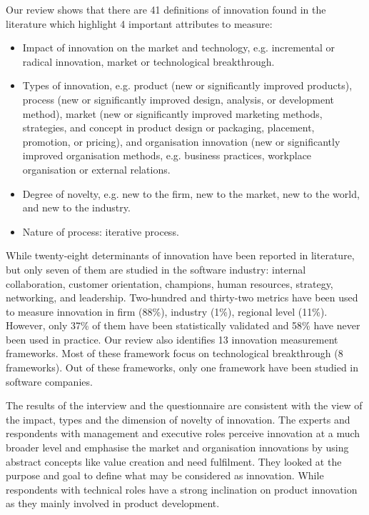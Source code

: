 \documentclass[sigplan]{acmart}
\begin{document}
Our review shows that there are 41 definitions of innovation found in the literature which highlight 4 important attributes to measure: 
\begin{itemize}
	\item Impact of innovation on the market and technology, e.g. incremental or radical innovation, market or technological breakthrough.
	\item Types of innovation, e.g. product (new or significantly improved products), process (new or significantly improved design, analysis, or development method), market (new or significantly improved marketing methods, strategies, and concept in product design or packaging, placement, promotion, or pricing), and organisation innovation (new or significantly improved organisation methods, e.g. business practices, workplace organisation or external relations.
	\item Degree of novelty, e.g. new to the firm, new to the market, new to the world, and new to the industry.
	\item Nature of process: iterative process.
\end{itemize}

While twenty-eight determinants of innovation have been reported in literature, but only seven of them are studied in the software industry: internal collaboration, customer orientation, champions, human resources, strategy, networking, and leadership. Two-hundred and thirty-two metrics have been used to measure innovation in firm (88\%), industry (1\%), regional level (11\%). However, only 37\% of them have been statistically validated and 58\% have never been used in practice. Our review also identifies 13 innovation measurement frameworks. Most of these framework focus on technological breakthrough (8 frameworks). Out of these frameworks, only one framework have been studied in software companies. 

The results of the interview and the questionnaire are consistent with the view of the impact, types and the dimension of novelty of innovation. The experts and respondents with management and executive roles perceive innovation at a much broader level and emphasise the market and organisation innovations by using abstract concepts like value creation and need fulfilment. They looked at the purpose and goal to define what may be considered as innovation. While respondents with technical roles have a strong inclination on product innovation as they mainly involved in product development.
\end{document}
